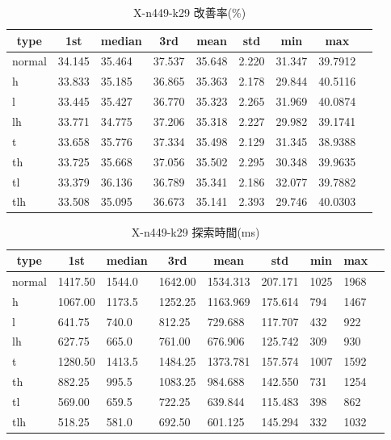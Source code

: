 \begin{table}[htbp]
    \caption{X-n449-k29 改善率(\%)}
    \begin{tabular}{|l|l|l|l|l|l|l|l|l|}\hline
    \multicolumn{1}{|c|}{\textbf{type}}
    &\multicolumn{1}{|c|}{\textbf{1st}}
    &\multicolumn{1}{c|}{\textbf{median}}
    &\multicolumn{1}{c|}{\textbf{3rd}}
    &\multicolumn{1}{c|}{\textbf{mean}}
    &\multicolumn{1}{c|}{\textbf{std}}
    &\multicolumn{1}{c|}{\textbf{min}}
    &\multicolumn{1}{c|}{\textbf{max}}\\\hline
	normal & 34.145 & 35.464 & 37.537 & 35.648 & 2.220 & 31.347 & 39.7912\\\hline
	h & 33.833 & 35.185 & 36.865 & 35.363 & 2.178 & 29.844 & 40.5116\\\hline
	l & 33.445 & 35.427 & 36.770 & 35.323 & 2.265 & 31.969 & 40.0874\\\hline
	lh & 33.771 & 34.775 & 37.206 & 35.318 & 2.227 & 29.982 & 39.1741\\\hline
	t & 33.658 & 35.776 & 37.334 & 35.498 & 2.129 & 31.345 & 38.9388\\\hline
	th & 33.725 & 35.668 & 37.056 & 35.502 & 2.295 & 30.348 & 39.9635\\\hline
	tl & 33.379 & 36.136 & 36.789 & 35.341 & 2.186 & 32.077 & 39.7882\\\hline
	tlh & 33.508 & 35.095 & 36.673 & 35.141 & 2.393 & 29.746 & 40.0303\\\hline
	\end{tabular}
\end{table}
\begin{table}[htbp]
    \caption{X-n449-k29 探索時間(ms)}
    \begin{tabular}{|l|l|l|l|l|l|l|l|l|}\hline
    \multicolumn{1}{|c|}{\textbf{type}}
    &\multicolumn{1}{|c|}{\textbf{1st}}
    &\multicolumn{1}{c|}{\textbf{median}}
    &\multicolumn{1}{c|}{\textbf{3rd}}
    &\multicolumn{1}{c|}{\textbf{mean}}
    &\multicolumn{1}{c|}{\textbf{std}}
    &\multicolumn{1}{c|}{\textbf{min}}
    &\multicolumn{1}{c|}{\textbf{max}}\\\hline
	normal & 1417.50 & 1544.0 & 1642.00 & 1534.313 & 207.171 & 1025 & 1968\\\hline
	h & 1067.00 & 1173.5 & 1252.25 & 1163.969 & 175.614 & 794 & 1467\\\hline
	l & 641.75 & 740.0 & 812.25 & 729.688 & 117.707 & 432 & 922\\\hline
	lh & 627.75 & 665.0 & 761.00 & 676.906 & 125.742 & 309 & 930\\\hline
	t & 1280.50 & 1413.5 & 1484.25 & 1373.781 & 157.574 & 1007 & 1592\\\hline
	th & 882.25 & 995.5 & 1083.25 & 984.688 & 142.550 & 731 & 1254\\\hline
	tl & 569.00 & 659.5 & 722.25 & 639.844 & 115.483 & 398 & 862\\\hline
	tlh & 518.25 & 581.0 & 692.50 & 601.125 & 145.294 & 332 & 1032\\\hline
	\end{tabular}
\end{table}
